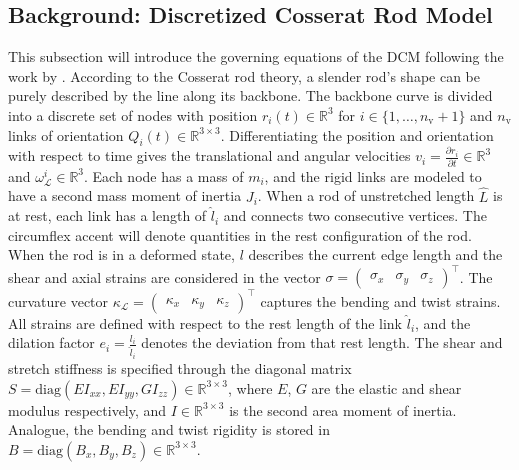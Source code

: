 \subsection{Background: Discretized Cosserat Rod Model}\label{sub:hsamodel:hsa_robot_simulation:discretized_cosserat_rod_model}
This subsection will introduce the governing equations of the \gls{DCM} following the work by \citet{gazzola2018forward}.
According to the Cosserat rod theory, a slender rod's shape can be purely described by the line along its backbone. %
The backbone curve is divided into a discrete set of nodes with position $r_i(t) \in \mathbb{R}^3$ for $i \in \{1,\dots,n_\mathrm{v}+1\}$ and $n_\mathrm{v}$ links of orientation $Q_i(t) \in \mathbb{R}^{3 \times 3}$.
Differentiating the position and orientation with respect to time gives the translational and angular velocities $v_i = \frac{\partial r_i}{\partial t} \in \mathbb{R}^3$ and $\omega_{\mathcal{L}}^i \in \mathbb{R}^3$.
Each node has a mass of $m_i$, and the rigid links are modeled to have a second mass moment of inertia $J_i$.
When a rod of unstretched length $\hat{L}$ is at rest, each link has a length of $\hat{l}_i$ and connects two consecutive vertices. 
The circumflex accent will denote quantities in the rest configuration of the rod.
When the rod is in a deformed state, $l$ describes the current edge length and
the shear and axial strains are considered in the vector $\sigma = \begin{pmatrix} \sigma_x & \sigma_y & \sigma_z \end{pmatrix}^\top$. The curvature vector $\kappa_{\mathcal{L}} = \begin{pmatrix} \kappa_x & \kappa_y & \kappa_z \end{pmatrix}^\top$ captures the bending and twist strains.
All strains are defined with respect to the rest length of the link $\hat{l}_i$, and the dilation factor $e_i = \frac{l_i}{\hat{l}_i}$ denotes the deviation from that rest length.
The shear and stretch stiffness is specified through the diagonal matrix $S = \mathrm{diag}(E I_{xx}, E I_{yy}, G I_{zz}) \in \mathbb{R}^{3 \times 3}$, where $E$, $G$ are the elastic and shear modulus respectively, and $I \in \mathbb{R}^{3 \times 3}$ is the second area moment of inertia. Analogue, the bending and twist rigidity is stored in $B = \mathrm{diag}(B_x, B_y, B_z) \in \mathbb{R}^{3 \times 3}$.
